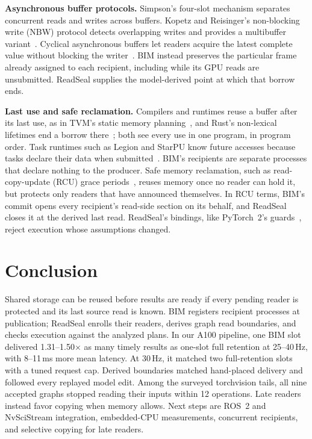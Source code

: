 \documentclass[conference]{IEEEtran}
\newcommand{\ms}{\,ms}
\newcommand{\Hz}{\,Hz}
\newif\ifaidisclosure
\begin{document}
\textbf{Asynchronous buffer protocols.} Simpson's four-slot mechanism separates concurrent reads and writes across buffers. Kopetz and Reisinger's non-blocking write (NBW) protocol detects overlapping writes and provides a multibuffer variant~\cite{simpson,nbw,rushbyfour}. Cyclical asynchronous buffers let readers acquire the latest complete value without blocking the writer~\cite{buttazzocab}. BIM instead preserves the particular frame already assigned to each recipient, including while its GPU reads are unsubmitted. ReadSeal supplies the model-derived point at which that borrow ends.

\textbf{Last use and safe reclamation.} Compilers and runtimes reuse a buffer after its last use, as in TVM's static memory planning~\cite{tvm}, and Rust's non-lexical lifetimes end a borrow there~\cite{nll}; both see every use in one program, in program order. %
\ifaidisclosure\else Task runtimes such as Legion and StarPU know future accesses because tasks declare their data when submitted~\cite{legion,starpu}. \fi
BIM's recipients are separate processes that declare nothing to the producer. Safe memory reclamation, such as read-copy-update (RCU) grace periods~\cite{rcu}, reuses memory once no reader can hold it, but protects only readers that have announced themselves. In RCU terms, BIM's commit opens every recipient's read-side section on its behalf, and ReadSeal closes it at the derived last read. ReadSeal's bindings, like PyTorch~2's guards~\cite{pytorch2}, reject execution whose assumptions changed.

\section{Conclusion}

Shared storage can be reused before results are ready if every pending reader is protected and its last source read is known. BIM registers recipient processes at publication; ReadSeal enrolls their readers, derives graph read boundaries, and checks execution against the analyzed plans. In our A100 pipeline, one BIM slot delivered 1.31--1.50$\times$ as many timely results as one-slot full retention at 25--40\Hz, with 8--11\ms{} more mean latency. At 30\Hz, it matched two full-retention slots with a tuned request cap. Derived boundaries matched hand-placed delivery and followed every replayed model edit. Among the surveyed torchvision tails, all nine accepted graphs stopped reading their inputs within 12 operations. Late readers instead favor copying when memory allows. Next steps are ROS~2 and NvSciStream integration, embedded-CPU measurements, concurrent recipients, and selective copying for late readers.
\end{document}
